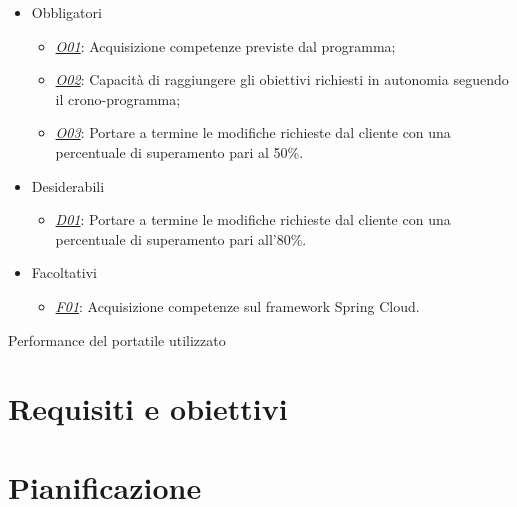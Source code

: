 \begin{itemize}[noitemsep]
	\item Obbligatori
	\begin{itemize}
		\item \underline{\textit{O01}}: Acquisizione competenze previste dal programma;
		\item \underline{\textit{O02}}: Capacità di raggiungere gli obiettivi richiesti in autonomia seguendo il crono-programma;
		\item \underline{\textit{O03}}: Portare a termine le modifiche richieste dal cliente con una percentuale di superamento pari al 50\%.
	\end{itemize}
	\item Desiderabili
	\begin{itemize}
		\item \underline{\textit{D01}}: Portare a termine le modifiche richieste dal cliente con una percentuale di superamento pari all'80\%.
	\end{itemize}
	\item Facoltativi
	\begin{itemize}
		\item \underline{\textit{F01}}: Acquisizione competenze sul framework Spring Cloud.
	\end{itemize}
\end{itemize}


%

\begin{risk}{Performance del portatile utilizzato}
    \label{risk:hardware-simulator}
\end{risk}

\section{Requisiti e obiettivi}


\section{Pianificazione}
